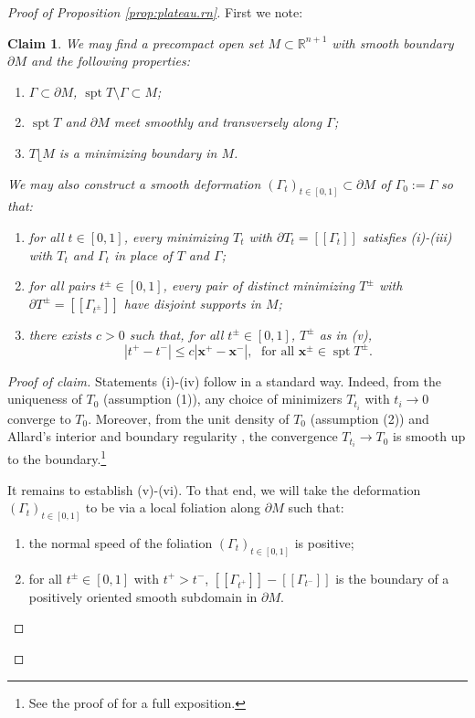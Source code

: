 \documentclass[11pt, letterpaper, reqno]{amsart}
\numberwithin{equation}{section}
\newtheorem{Cla}[Def]{Claim}
\theoremstyle{remark}
\newcommand{\RR}{\mathbb{R}}
\newcommand{\mbfx}{\mathbf{x}}
\newcommand{\spt}{\operatorname{spt}}
\newcommand{\llbracket}{[\![}
\newcommand{\rrbracket}{]\!]}
\newcommand{\mres}{\lfloor}
\begin{document}
\begin{proof}[Proof of Proposition \ref{prop:plateau.rn}]
	First we note:
	
	\begin{Cla} \label{clai:plateau.rn}
	We may find a precompact open set $M \subset \RR^{n+1}$ with smooth boundary $\partial M$ and the following properties:
	\begin{enumerate}
		\item[(i)] $\Gamma \subset \partial M$, $\spt T \setminus \Gamma \subset M$;
		\item[(ii)] $\spt T$ and $\partial M$ meet smoothly and transversely along $\Gamma$;
		\item[(iii)] $T \mres M$ is a minimizing boundary in $M$.
	\end{enumerate}
	We may also construct a smooth deformation $(\Gamma_t)_{t \in [0,1]} \subset \partial M$ of $\Gamma_0 := \Gamma$ so that:
	\begin{enumerate}
		\item[(iv)] for all $t \in [0,1]$, every minimizing $T_t$ with $\partial T_t = \llbracket \Gamma_t \rrbracket$ satisfies (i)-(iii) with $T_t$ and $\Gamma_t$ in place of $T$ and $\Gamma$;
		\item[(v)] for all pairs $t^\pm \in [0,1]$, every pair of distinct minimizing $T^\pm$ with $\partial T^\pm = \llbracket \Gamma_{t^\pm} \rrbracket$ have disjoint supports in $M$;
		\item[(vi)] there exists $c > 0$ such that, for all $t^\pm \in [0,1]$, $T^\pm$ as in (v),
			\[ |t^+-t^-| \leq c |\mbfx^+ - \mbfx^-|, \; \text{ for all } \mbfx^\pm \in \spt T^\pm. \]
	\end{enumerate}
	\end{Cla}
	\begin{proof}[Proof of claim]	
	Statements (i)-(iv) follow in a standard way. Indeed, from the uniqueness of $T_0$ (assumption (1)), any choice of minimizers $T_{t_i}$ with $t_i \to 0$ converge to $T_0$. Moreover, from the unit density of $T_0$ (assumption (2)) and Allard's interior \cite{Allard:first-variation} and boundary regularity \cite{Allard:boundary-regularity}, the convergence $T_{t_i} \to T_0$ is smooth up to the boundary.\footnote{See the proof of \cite[Lemma 4.3]{CMS:generic.9.10} for a full exposition.} 
	
	It remains to establish (v)-(vi). To that end, we will take the deformation $(\Gamma_t)_{t \in [0,1]}$ to be via a local foliation along $\partial M$ such that:
		\begin{enumerate}
			\item[(I)] the normal speed of the foliation $(\Gamma_t)_{t \in [0,1]}$ is positive;
			\item[(II)] for all $t^\pm \in [0,1]$ with $t^+ > t^-$, $\llbracket \Gamma_{t^+} \rrbracket - \llbracket \Gamma_{t^-} \rrbracket$ is the boundary of a positively oriented smooth subdomain in $\partial M$.
		\end{enumerate}
		

\end{proof}
\end{proof}
\end{document}
